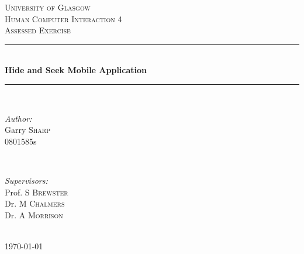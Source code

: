 \documentclass[12pt]{article} %
\begin{document}

\begin{titlepage}

\newcommand{\HRule}{\rule{\linewidth}{0.5mm}} %

\center %

\textsc{\LARGE University of Glasgow}\\[1.5cm] %
\textsc{\Large Human Computer Interaction 4}\\[0.5cm] %
\textsc{\large Assessed Exercise}\\[0.5cm] %

\HRule \\[0.4cm]
{ \huge \bfseries Hide and Seek Mobile Application}\\[0.4cm] %
\HRule \\[1.5cm]

\begin{minipage}{0.4\textwidth}
\begin{flushleft} \large
\emph{Author:}\\
Garry \textsc{Sharp}\\
0801585s\\ %
\end{flushleft}
\end{minipage}
~
\begin{minipage}{0.4\textwidth}
\begin{flushright} \large
\emph{Supervisors:} \\
Prof. S \textsc{Brewster}\\ %
Dr. M \textsc{Chalmers}\\ %
Dr. A \textsc{Morrison}\\ %
\end{flushright}
\end{minipage}\\[4cm]

{\large \today}\\[3cm] %


\vfill %

\end{titlepage}
\end{document}
